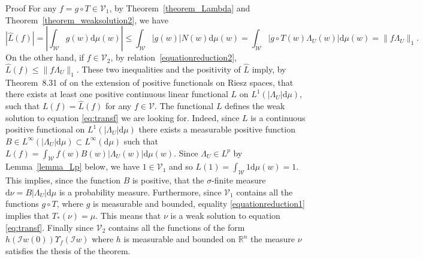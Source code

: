 \documentclass[a4paper,10pt]{article}
\newcommand{\asterisk}{\mathord{*}}
\newcommand{\mathd}{\mathrm{d}}
\newenvironment{proof*}[1]{\noindent\textbf{#1\ }}{\hspace*{\fill}$\Box$\medskip}
\begin{document}
\begin{proof*}{Proof}
  For any $f = g \circ T \in \mathcal{V}_1$, by Theorem~\ref{theorem_Lambda}
  and Theorem~\ref{theorem_weaksolution2}, we have
  \[ | \hat{L} (f) | = \left| \int_{\mathcal{W}} g (w) \mathd \mu (w) \right|
     \leqslant \int_{\mathcal{W}} | g (w) | N (w) \mathd \mu (w) =
     \int_{\mathcal{W}} | g \circ T (w) \Lambda_U (w) | \mathd \mu (w) = \| f
     \Lambda_U \|_1 . \]
  On the other hand, if $f \in \mathcal{V}_2$, by
  relation~{\eqref{equationreduction2}}, $\hat{L} (f) \leqslant \| f \Lambda_U
  \|_1$. These two inequalities and the positivity of $\hat{L}$ imply, by
  Theorem~8.31 of {\cite{Aliprantis2006}} on the extension of positive
  functionals on Riesz spaces, that there exists at least one positive
  continuous linear functional $L$ on $L^1 (| \Lambda_U | \mathd \mu)$, such
  that $L (f) = \hat{L} (f)$ for any $f \in \mathcal{V}$. The functional $L$
  defines the weak solution to equation {\eqref{eq:transf}} we are looking
  for. Indeed, since $L$ is a continuous positive functional on $L^1 (|
  \Lambda_U | \mathd \mu)$ there exists a measurable positive function $B \in
  L^{\infty} (| \Lambda_U | \mathd \mu) \subset L^{\infty} (\mathd \mu)$ such
  that $L (f) = \int_{\mathcal{W}} f (w) B (w) | \Lambda_U (w) | \mathd \mu
  (w)$. Since $\Lambda_U \in L^p$ by Lemma~\ref{lemma_Lp} below, we have $1
  \in \mathcal{V}_1$ and so $L (1) = \int_{\mathcal{W}} 1 \mathd \mu (w) = 1$.
  This implies, since the function $B$ is positive, that the $\sigma$-finite
  measure $\mathd \nu = B | \Lambda_U | \mathd \mu$ is a probability measure.
  Furthermore, since $\mathcal{V}_1$ contains all the functions $g \circ T$,
  where $g$ is measurable and bounded, equality {\eqref{equationreduction1}}
  implies that $T_{\asterisk} (\nu) = \mu$. This means that $\nu$ is a weak
  solution to equation {\eqref{eq:transf}}. Finally since $\mathcal{V}_2$
  contains all the functions of the form $h (\mathcal{I}w (0)) \Upsilon_f
  (\mathcal{I}w)$ where $h$ is measurable and bounded on $\mathbb{R}^n$ the
  measure $\nu$ satisfies the thesis of the theorem.
\end{proof*}
\end{document}
